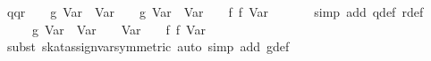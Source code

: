 \begin{isabellebody}
\ {}q{}{}{}{}q{}{}{}{}r{}{}\ {}\ {}\ {}{}\ g\ {}Var\ {}{}\ {}Var\ {}{}{}\ {}\ {}{}\ g\ {}Var\ {}{}\ {}Var\ {}{}{}\ {}\ {}{}\ f\ {}f\ {}Var\ {}{}{}{}\isanewline
\ \ \ \ \isamarkupfalse%
\ {}simp\ add{}\ q{}def\ r{}def{}\isanewline
\ \ \isamarkupfalse%
\ \isamarkupfalse%
\ {}{}{}{}\ {}\ {}\ {}{}\ g\ {}Var\ {}{}\ {}Var\ {}{}{}\ {}\ {}{}\ Var\ {}{}\ {}\ {}{}\ f\ {}f\ {}Var\ {}{}{}{}\isanewline
\ \ \ \ \isamarkupfalse%
\ {}subst\ skat{}assign{}{}var{}symmetric{}{}\ {}auto\ simp\ add{}\ g{}def{}\isanewline

\end{isabellebody}
